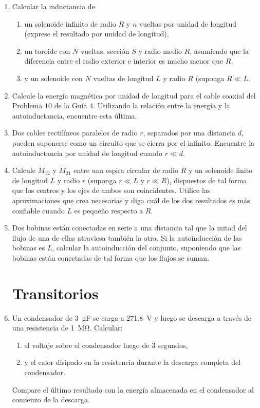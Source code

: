 \documentclass[11pt,spanish,a4paper]{article}
\begin{document}
\begin{enumerate}
	\item Calcular la inductancia de\hfill
		\begin{enumerate}
			\item un solenoide infinito de radio \(R\) y \(n\) vueltas por unidad de longitud (exprese el resultado por unidad de longitud),
			\item un toroide con \(N\) vueltas, sección \(S\) y radio medio \(R\), asumiendo que la diferencia entre el radio exterior e interior es mucho menor que \(R\), 
			\item y un solenoide con \(N\) vueltas de longitud \(L\) y radio \(R\) (suponga \(R \ll L\).
		\end{enumerate}


	\item Calcule la energía magnética por unidad de longitud para el cable coaxial del Problema \(10\) de la Guía \(4\).
		Utilizando la relación entre la energía y la autoinductancia, encuentre esta última.


	\item Dos cables rectilíneos paralelos de radio \(r\), separados por una distancia \(d\), pueden suponerse como un circuito que se cierra por el infinito.
		Encuentre la autoinductancia por unidad de longitud cuando \(r \ll d\).


	\item Calcule \(M_{12}\) y \(M_{21}\) entre una espira circular de radio \(R\) y un solenoide finito de longitud \(L\) y radio \(r\) (suponga \(r \ll L\) y \(r \ll R\)), dispuestos de tal forma que los centros y los ejes de ambos son coincidentes.
		Utilice las aproximaciones que crea necesarias y diga cuál de los dos resultados es más confiable cuando \(L\) es pequeño respecto a \(R\).


	\item Dos bobinas están conectadas en serie a una distancia tal que la mitad del flujo de una de ellas atraviesa también la otra.
		Si la autoinducción de las bobinas es \(L\), calcular la autoinducción del conjunto, suponiendo que las bobinas están conectadas de tal forma que los flujos se suman.


\section*{Transitorios}
	\item Un condensador de \SI{3}{\micro\farad} se carga a \SI{271.8}{\volt} y luego se descarga a través de una resistencia de \SI{1}{\mega\ohm}.
		Calcular:
		\begin{enumerate}
			\item el voltaje sobre el condensador luego de 3 segundos, 
			\item y el calor disipado en la resistencia durante la descarga completa del condensador.
		\end{enumerate}
	Compare el último resultado con la energía almacenada en el condensador al comienzo de la descarga.



\end{enumerate}
\end{document}

